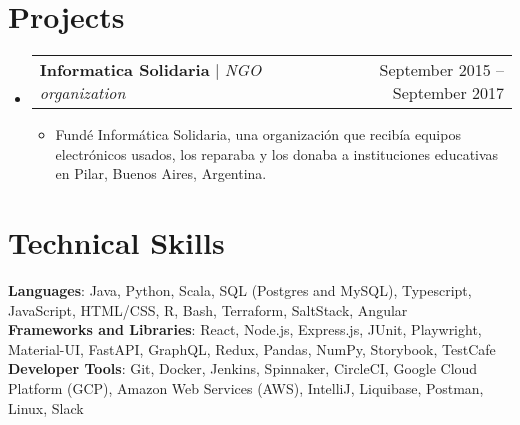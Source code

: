 \documentclass[letterpaper,11pt]{article}
\makeatletter
\newcommand{\resumeItem}[1]{
  \item\small{
    {#1 \vspace{-2pt}}
  }
}
\newcommand{\resumeProjectHeading}[2]{
    \item
    \begin{tabular*}{0.97\textwidth}{l@{\extracolsep{\fill}}r}
      \small#1 & #2 \\
    \end{tabular*}\vspace{-7pt}
}
\newcommand{\resumeSubHeadingListStart}{\begin{itemize}[leftmargin=0.15in, label={}]}
\newcommand{\resumeSubHeadingListEnd}{\end{itemize}}
\newcommand{\resumeItemListStart}{\begin{itemize}}
\newcommand{\resumeItemListEnd}{\end{itemize}\vspace{-5pt}}
\makeatother
\begin{document}
\section{Projects}
    \resumeSubHeadingListStart
      \resumeProjectHeading
          {\textbf{Informatica Solidaria} $|$ \emph{NGO organization}}{September 2015 -- September 2017}
          \resumeItemListStart
            \resumeItem{Fundé Informática Solidaria, una organización que recibía equipos electrónicos usados, los reparaba y los donaba a instituciones educativas en Pilar, Buenos Aires, Argentina.}
          \resumeItemListEnd
    \resumeSubHeadingListEnd



%
\section{Technical Skills}
 \begin{itemize}[leftmargin=0.15in, label={}]
    \small{\item{
     \textbf{Languages}{: Java, Python, Scala, SQL (Postgres and MySQL), Typescript, JavaScript, HTML/CSS, R, Bash, Terraform, SaltStack, Angular} \\
     \textbf{Frameworks and Libraries}{: React, Node.js, Express.js, JUnit, Playwright, Material-UI, FastAPI, GraphQL, Redux, Pandas, NumPy, Storybook, TestCafe} \\
     \textbf{Developer Tools}{: Git, Docker, Jenkins, Spinnaker, CircleCI, Google Cloud Platform (GCP), Amazon Web Services (AWS), IntelliJ, Liquibase, Postman, Linux, Slack} \\
    }}
 \end{itemize}


\end{document}
